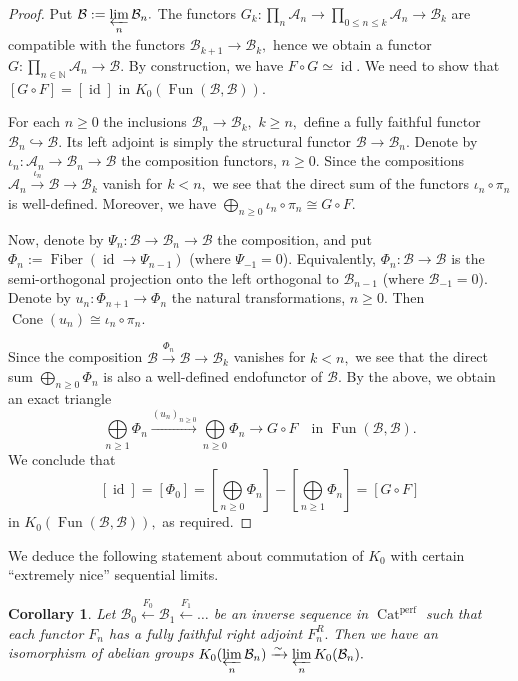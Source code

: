 \documentclass[11pt,leqno]{amsart}
\newtheorem{cor}[theo]{Corollary}
\numberwithin{equation}{section}
\def\N{\mathbb{N}}
\newcommand{\prolim}[1][]{\mathop{\varprojlim}\limits_{#1}}
\newcommand{\biggplus}[1][]{\mathop{\bigoplus}\limits_{#1}}
\newcommand{\prodd}[1][]{\mathop{\prod}\limits_{#1}}
\newcommand{\xto}{\xrightarrow}
\newcommand{\xlto}{\xleftarrow}
\newcommand{\hto}{\hookrightarrow}
\newcommand{\Cat}{\operatorname{Cat}}
\newcommand{\Cone}{\operatorname{Cone}}
\newcommand{\Fiber}{\operatorname{Fiber}}
\newcommand{\cA}{{\mathcal A}}
\newcommand{\cB}{{\mathcal B}}
\newcommand{\Fun}{\operatorname{Fun}}
\newcommand{\perf}{\operatorname{perf}}
\newcommand{\id}{\operatorname{id}}
\begin{document}
\begin{proof}Put $\cB:=\prolim[n]\cB_n.$ 
The functors $G_k:\prodd[n]\cA_n\to\prodd[0\leq n\leq k]\cA_n\to\cB_k$ are compatible with the functors $\cB_{k+1}\to\cB_k,$ hence we obtain a functor $G:\prodd[n\in\N]\cA_n\to\cB.$ By construction, we have $F\circ G\simeq\id.$ We need to show that $[G\circ F]=[\id]$ in $K_0(\Fun(\cB,\cB)).$

For each $n\geq 0$ the inclusions $\cB_n\to\cB_k,$ $k\geq n,$ define a fully faithful functor $\cB_n\hto\cB.$ Its left adjoint is simply the structural functor $\cB\to\cB_n.$ Denote by $\iota_n:\cA_n\to\cB_n\to\cB$ the composition functors, $n\geq 0.$ Since the compositions $\cA_n\xto{\iota_n}\cB\to\cB_k$ vanish for $k<n,$ we see that the direct sum of the functors $\iota_n\circ \pi_n$ is well-defined. Moreover, we have $\biggplus[n\geq 0]\iota_n\circ \pi_n\cong G\circ F.$ 

Now, denote by $\Psi_n:\cB\to\cB_n\to\cB$ the composition, and put $\Phi_n:=\Fiber(\id\to \Psi_{n-1})$ (where $\Psi_{-1}=0$). Equivalently, $\Phi_n:\cB\to\cB$ is the semi-orthogonal projection onto the left orthogonal to $\cB_{n-1}$ (where $\cB_{-1}=0$). Denote by $u_n:\Phi_{n+1}\to\Phi_n$ the natural transformations, $n\geq 0.$ Then $\Cone(u_n)\cong \iota_n\circ \pi_n.$

Since the composition $\cB\xto{\Phi_n}\cB\to\cB_k$ vanishes for $k<n,$ we see that the direct sum $\biggplus[n\geq 0]\Phi_n$ is also a well-defined endofunctor of $\cB.$ By the above, we obtain an exact triangle
$$\biggplus[n\geq 1]\Phi_n\xto{(u_n)_{n\geq 0}}\biggplus[n\geq 0]\Phi_n\to G\circ F\quad\text{in }\Fun(\cB,\cB).$$
We conclude that
$$[\id]=[\Phi_0]=[\biggplus[n\geq 0]\Phi_n]-[\biggplus[n\geq 1]\Phi_n]=[G\circ F]$$
in $K_0(\Fun(\cB,\cB)),$ as required.
\end{proof}

We deduce the following statement about commutation of $K_0$ with certain ``extremely nice'' sequential limits.

\begin{cor}\label{cor:K_0_of_nice_limits} Let $\cB_0\xlto{F_0}\cB_1\xlto{F_1}\dots$ be an inverse sequence in $\Cat^{\perf}$ such that each functor $F_n$ has a fully faithful right adjoint $F_n^R.$ Then we have an isomorphism of abelian groups $K_0(\prolim[n]\cB_n)\xto{\sim}\prolim[n]K_0(\cB_n).$\end{cor}
\end{document}
